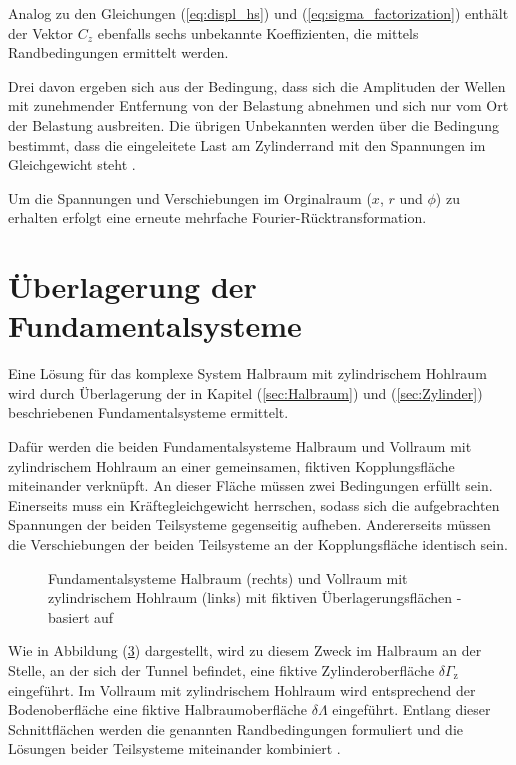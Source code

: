 Analog zu den Gleichungen (\ref{eq:displ_hs}) und (\ref{eq:sigma_factorization}) enthält der Vektor \(C_{z}\) ebenfalls sechs unbekannte Koeffizienten, die mittels Randbedingungen ermittelt werden.

Drei davon ergeben sich aus der Bedingung, dass sich die Amplituden der Wellen mit zunehmender Entfernung von der Belastung abnehmen und sich nur vom Ort der Belastung ausbreiten.
Die übrigen Unbekannten werden über die Bedingung bestimmt, dass die eingeleitete Last am Zylinderrand mit den Spannungen im Gleichgewicht steht \citep{Fruehe2010}.

Um die Spannungen und Verschiebungen im Orginalraum ($x$, $r$ und $\phi$) zu erhalten erfolgt eine erneute mehrfache Fourier-Rücktransformation. 





\section{Überlagerung der Fundamentalsysteme}
\label{sec:Superposition}

Eine Lösung für das komplexe System Halbraum mit zylindrischem Hohlraum wird durch Überlagerung der in Kapitel (\ref{sec:Halbraum}) und (\ref{sec:Zylinder}) beschriebenen Fundamentalsysteme ermittelt.

Dafür werden die beiden Fundamentalsysteme Halbraum und Vollraum mit zylindrischem Hohlraum an einer gemeinsamen, fiktiven Kopplungsfläche miteinander verknüpft. 
An dieser Fläche müssen zwei Bedingungen erfüllt sein. 
Einerseits muss ein Kräftegleichgewicht herrschen, sodass sich die aufgebrachten Spannungen der beiden Teilsysteme gegenseitig aufheben. 
Andererseits müssen die Verschiebungen der beiden Teilsysteme an der Kopplungsfläche identisch sein.
\begin{figure}[H]
	\hspace*{5mm}
	\centering
	\begin{subfigure}[t]{0.48\textwidth}
		\centering
		
		\label{fig:Halbraum_fiktiveFlächen}
	\end{subfigure}\hfill
	\begin{subfigure}[t]{0.48\textwidth}
		\centering
		
		\label{fig:Zylinder_fiktiveFlächen}
	\end{subfigure}
	\caption{Fundamentalsysteme Halbraum (rechts) und Vollraum mit zylindrischem Hohlraum (links) mit fiktiven Überlagerungsflächen - basiert auf \cite{Freisinger2022}}
	\label{fig:Überlagerung_fiktiveFlächen}
\end{figure}
Wie in Abbildung (\ref{fig:Überlagerung_fiktiveFlächen}) dargestellt, wird zu diesem Zweck im Halbraum an der Stelle, an der sich der Tunnel befindet, eine fiktive Zylinderoberfläche $\delta\Gamma_{\mathrm z}$ eingeführt. Im Vollraum mit zylindrischem Hohlraum wird entsprechend der Bodenoberfläche eine fiktive Halbraumoberfläche $\delta\Lambda$ eingeführt. 
Entlang dieser Schnittflächen werden die genannten Randbedingungen formuliert und die Lösungen beider Teilsysteme miteinander kombiniert \citep{Mueller2007}.
 
